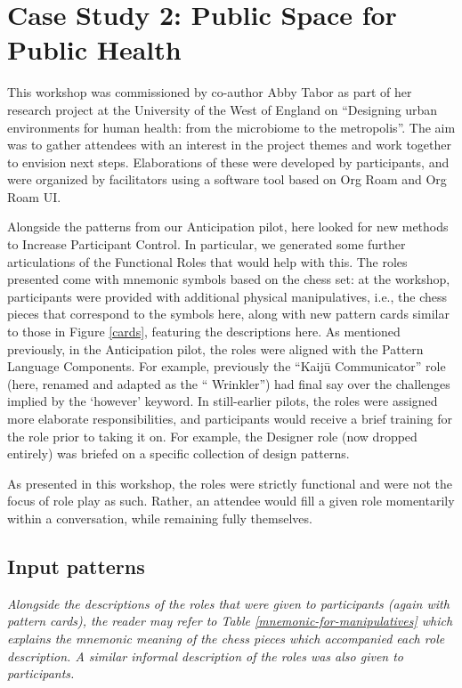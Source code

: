 \documentclass[acmlarge,timestamp]{acmart}
\begin{document}
\clearpage

\section{Case Study 2: Public Space for Public Health}\label{second-case-study}

This workshop was commissioned by co-author Abby Tabor as part of her
research project at the University of the West of England on
“Designing urban environments for human health: from the microbiome to
the metropolis”.  The aim was to gather attendees with an interest in
the project themes and work together to envision next
steps. Elaborations of these were developed by participants, and were
organized by facilitators using a software tool based on Org Roam and
Org Roam UI.

Alongside the patterns from our Anticipation pilot, here looked for
new methods to {\sc Increase Participant Control}.  In particular, we
generated some further articulations of the {\sc Functional Roles}
that would help with this.  The roles presented come with mnemonic
symbols based on the chess set: at the workshop, participants were
provided with additional physical manipulatives, i.e., the chess
pieces that correspond to the symbols here, along with new pattern
cards similar to those in Figure \ref{cards}, featuring the
descriptions here.  As mentioned previously, in the Anticipation
pilot, the roles were aligned with the {\sc Pattern Language
  Components}.  For example, previously the “{\sc Kaij\=u
  Communicator}” role (here, renamed and adapted as the “{\sc
  Wrinkler}”) had final say over the challenges implied by the
‘however’ keyword.  In still-earlier pilots, the roles were assigned
more elaborate responsibilities, and participants would receive a
brief training for the role prior to taking it on.  For example, the
{\sc Designer} role (now dropped entirely) was briefed on a specific
collection of design patterns.

As presented in this workshop, the roles were strictly functional and
were not the focus of role play as such.  Rather, an attendee would
fill a given role momentarily within a conversation, while remaining
fully themselves.

\subsection{Input patterns}

\emph{Alongside the descriptions of the roles that were given to
participants (again with pattern cards), the reader may refer to Table
\ref{mnemonic-for-manipulatives} which explains the mnemonic meaning
of the chess pieces which accompanied each role description.  A
similar informal description of the roles was also given to
participants.}
\end{document}
